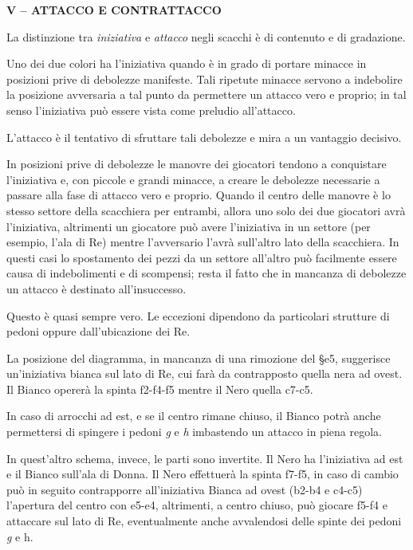 \textbf{V -- ATTACCO E CONTRATTACCO}

La distinzione tra \emph{iniziativa} e \emph{attacco} negli scacchi è di
contenuto e di gradazione.

Uno dei due colori ha l'iniziativa quando è in grado di portare minacce
in posizioni prive di debolezze manifeste. Tali ripetute minacce servono
a indebolire la posizione avversaria a tal punto da permettere un
attacco vero e proprio; in tal senso l'iniziativa può essere vista come
preludio all'attacco.

L'attacco è il tentativo di sfruttare tali debolezze e mira a un
vantaggio decisivo.

In posizioni prive di debolezze le manovre dei giocatori tendono a
conquistare l'iniziativa e, con piccole e grandi minacce, a creare le
debolezze necessarie a passare alla fase di attacco vero e proprio.
Quando il centro delle manovre è lo stesso settore della scacchiera per
entrambi, allora uno solo dei due giocatori avrà l'iniziativa,
altrimenti un giocatore può avere l'iniziativa in un settore (per
esempio, l'ala di Re) mentre l'avversario l'avrà sull'altro lato della
scacchiera. In questi casi lo spostamento dei pezzi da un settore
all'altro può facilmente essere causa di indebolimenti e di scompensi;
resta il fatto che in mancanza di debolezze un attacco è destinato
all'insuccesso.

Questo è quasi sempre vero. Le eccezioni dipendono da particolari
strutture di pedoni oppure dall'ubicazione dei Re.


La posizione del diagramma, in mancanza di una rimozione del §e5,
suggerisce un'iniziativa bianca sul lato di Re, cui farà da contrapposto
quella nera ad ovest. Il Bianco opererà la spinta f2-f4-f5 mentre il
Nero quella c7-c5.

In caso di arrocchi ad est, e se il centro rimane chiuso, il Bianco
potrà anche permettersi di spingere i pedoni \emph{g} e \emph{h}
imbastendo un attacco in piena regola.


In quest'altro schema, invece, le parti sono invertite. Il Nero ha
l'iniziativa ad est e il Bianco sull'ala di Donna. Il Nero effettuerà la
spinta f7-f5, in caso di cambio può in seguito contrapporre
all'iniziativa Bianca ad ovest (b2-b4 e c4-c5) l'apertura del centro con
e5-e4, altrimenti, a centro chiuso, può giocare f5-f4 e attaccare sul
lato di Re, eventualmente anche avvalendosi delle spinte dei pedoni
\emph{g} e h.

